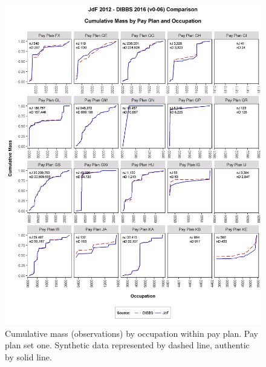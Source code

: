 \documentclass[10pt, letterpaper]{article}
\begin{document}
\begin{spacing}{1.0}
\begin{figure}[h]
    \centering
    \includegraphics[width=6.25in, trim={0 1in 0 0.75in}, clip]{CMFOccupationPayPlan61.png}
    \caption{Cumulative mass (observations) by occupation within pay plan.  Pay plan set one.  Synthetic data represented by dashed line, authentic by solid line.}
    \label{figure:CMFOccupationPayPlan1}
\end{figure}

\clearpage


\end{spacing}
\end{document}
